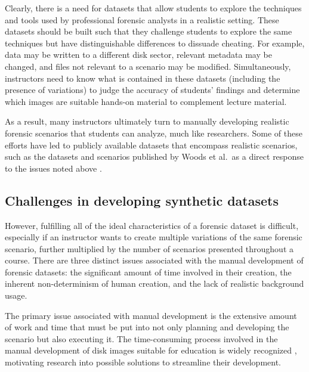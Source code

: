 \documentclass[letterpaper,12pt]{report}
\begin{document}
Clearly, there is a need for datasets that allow students to explore the
techniques and tools used by professional forensic analysts in a
realistic setting. These datasets should be built such that they
challenge students to explore the same techniques but have
distinguishable differences to dissuade cheating. For example, data may
be written to a different disk sector, relevant metadata may be changed,
and files not relevant to a scenario may be modified. Simultaneously,
instructors need to know what is contained in these datasets (including
the presence of variations) to judge the accuracy of students' findings
and determine which images are suitable hands-on material to complement
lecture material.

As a result, many instructors ultimately turn to manually developing
realistic forensic scenarios that students can analyze, much like
researchers. Some of these efforts have led to publicly available
datasets that encompass realistic scenarios, such as the datasets and
scenarios published by Woods et al.~as a direct response to the issues
noted above \cite{woodsCreatingRealisticCorpora2011}.

\subsection{Challenges in developing synthetic
datasets}\label{challenges-in-developing-synthetic-datasets}

However, fulfilling all of the ideal characteristics of a forensic
dataset is difficult, especially if an instructor wants to create
multiple variations of the same forensic scenario, further multiplied by
the number of scenarios presented throughout a course. There are three
distinct issues associated with the manual development of forensic
datasets: the significant amount of time involved in their creation, the
inherent non-determinism of human creation, and the lack of realistic
background usage.

The primary issue associated with manual development is the extensive
amount of work and time that must be put into not only planning and
developing the scenario but also executing it. The time-consuming
process involved in the manual development of disk images suitable for
education is widely recognized
\cite{adelsteinAutomaticallyCreatingRealistic2005,gobelForTraceHolisticForensic2022,guptaDigitalForensicsLab2022,mochForensicImageGenerator2009,russellForensicImageDescription2012,scanlonEviPlantEfficientDigital2017,woodsCreatingRealisticCorpora2011},
motivating research into possible solutions to streamline their
development.
\end{document}
